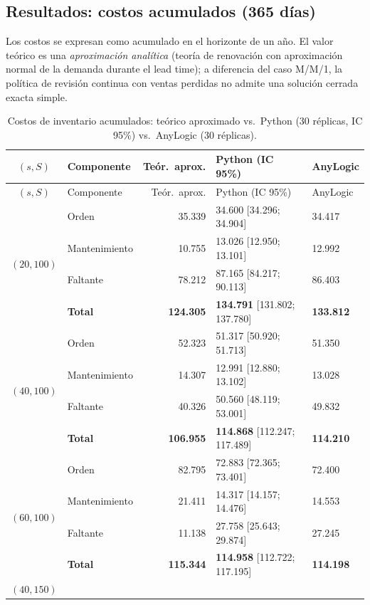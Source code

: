 \documentclass[11pt,a4paper]{article}
\begin{document}
\subsection{Resultados: costos acumulados (365 días)}

Los costos se expresan como acumulado en el horizonte de un año. El valor
teórico es una \emph{aproximación analítica} (teoría de renovación con
aproximación normal de la demanda durante el lead time); a diferencia del
caso M/M/1, la política de revisión continua con ventas perdidas no admite
una solución cerrada exacta simple.

{\small
\begin{longtable}{clrll}
\caption{Costos de inventario acumulados: teórico aproximado vs.\ Python
(30 réplicas, IC 95\%) vs.\ AnyLogic (30 réplicas).}
\label{tab:inv-costos} \\
\toprule
$(s,S)$ & Componente & Teór.\ aprox. & Python (IC 95\%) & AnyLogic \\
\midrule
\endfirsthead
\toprule
$(s,S)$ & Componente & Teór.\ aprox. & Python (IC 95\%) & AnyLogic \\
\midrule
\endhead
\multirow{4}{*}{$(20,100)$}
 & Orden & 35.339 & 34.600 [34.296; 34.904] & 34.417 \\
 & Mantenimiento & 10.755 & 13.026 [12.950; 13.101] & 12.992 \\
 & Faltante & 78.212 & 87.165 [84.217; 90.113] & 86.403 \\
 & \textbf{Total} & \textbf{124.305} & \textbf{134.791} [131.802; 137.780] & \textbf{133.812} \\
\midrule
\multirow{4}{*}{$(40,100)$}
 & Orden & 52.323 & 51.317 [50.920; 51.713] & 51.350 \\
 & Mantenimiento & 14.307 & 12.991 [12.880; 13.102] & 13.028 \\
 & Faltante & 40.326 & 50.560 [48.119; 53.001] & 49.832 \\
 & \textbf{Total} & \textbf{106.955} & \textbf{114.868} [112.247; 117.489] & \textbf{114.210} \\
\midrule
\multirow{4}{*}{$(60,100)$}
 & Orden & 82.795 & 72.883 [72.365; 73.401] & 72.400 \\
 & Mantenimiento & 21.411 & 14.317 [14.157; 14.476] & 14.553 \\
 & Faltante & 11.138 & 27.758 [25.643; 29.874] & 27.245 \\
 & \textbf{Total} & \textbf{115.344} & \textbf{114.958} [112.722; 117.195] & \textbf{114.198} \\
\midrule
\multirow{4}{*}{$(40,150)$}

\end{longtable}}
\end{document}
